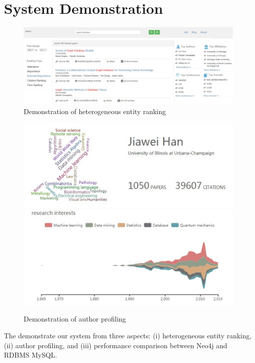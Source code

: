 \section{System Demonstration}
\label{sec-demo}

\begin{figure}[tp]
\centering
\includegraphics[width=\textwidth]{searchKeywords.pdf}
\vspace{-3ex}
\caption{Demonstration of heterogeneous entity ranking}
\label{fig:searchKeywords}
\vspace{-2ex}
\end{figure}

\begin{figure}
\centering
\includegraphics[width=0.8\columnwidth]{hjwAvatar.pdf}
\includegraphics[width=0.8\columnwidth]{hjwInterest.pdf}
\vspace{-1ex}
\caption{Demonstration of author profiling}
\label{fig:hjwProfile}
\vspace{-2ex}
\end{figure}

The demonstrate our system from three aspects: (i) heterogeneous entity ranking, (ii) author profiling, and (iii) performance comparison between Neo4j and RDBMS MySQL.


